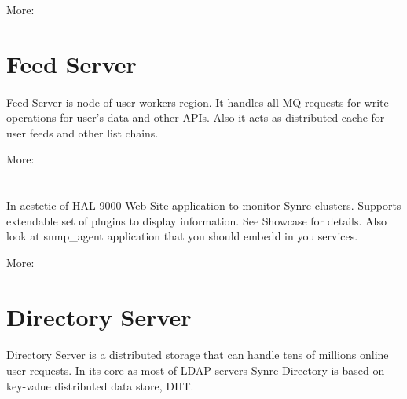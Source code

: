 \documentclass[11pt]{article}
\begin{document}
More: 

\section*{Feed Server}
\paragraph{}
Feed Server is node of user workers region. It handles all MQ
requests for write operations for user's data and other APIs.
Also it acts as distributed cache for user feeds and other list chains.

More: 

\section*{}
\paragraph{}
In aestetic of HAL 9000 Web Site application to monitor Synrc clusters.
Supports extendable set of plugins to display information. See Showcase for details.
Also look at snmp_agent application that you should embedd in you services.

More: 

\section*{Directory Server}
\paragraph{}
Directory Server is a distributed storage that can handle tens of
millions online user requests. 
In its core as most of LDAP servers Synrc Directory is based on
key-value distributed data store, DHT.
\end{document}
